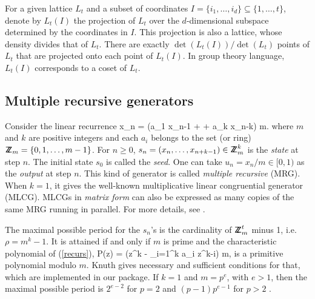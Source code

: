For a given lattice $L_t$ and a subset of coordinates
$I = \{i_1,\dots,i_d\} \subseteq \{1,\dots,t\}$, denote by $L_t(I)$
the projection of $L_t$ over the $d$-dimensional subspace determined
by the coordinates in $I$.
This projection is also a lattice, whose density divides that of $L_t$.
There are exactly $\det(L_t(I))/\det(L_t)$ points of $L_t$ that are
projected onto each point of $L_t(I)$.
In group theory language, $L_t(I)$ corresponds to a coset of $L_t$.

\subsection {Multiple recursive generators}

Consider the linear recurrence
\eq
   x_n = (a_1 x_{n-1} + \cdots + a_k x_{n-k}) \mod m.       
\endeq
where $m$ and $k$ are positive integers and each $a_i$ belongs to the
set (or ring) ${\sf Z\kern-0.4em Z}_m = \{0,1,\dots,m-1\}$.
For $n\ge 0$, $s_n = (x_{n},\dots,x_{n+k-1}) \in {\sf Z\kern-0.4em Z}_m^k$ is the {\em state}
at step $n$.  The initial state $s_0$ is called the {\em seed}.
One can take $u_n = x_n/m \in [0,1)$ as the {\em output} at step $n$.
This kind of generator is called {\em multiple recursive} (MRG).
When $k=1$, it gives the well-known multiplicative linear congruential
generator (MLCG).
MLCGs in {\em matrix form\/} can also be expressed as
many copies of the same MRG running in parallel.
For more details, see \cite{rGRO88a,rLEC90a,rLEC94a,rNIE86a}.

The maximal possible period for the $s_n$'s is the
cardinality of ${\sf Z\kern-0.4em Z}_m^t$ minus 1, i.e. $\rho = m^k-1$.
It is attained if and only if $m$ is prime and
the characteristic polynomial of (\ref{recurs}),
\eq
  P(z) = \left(z^k - \sum_{i=1}^k a_i z^{k-i}\right) \mod m,  
\endeq
is a primitive polynomial modulo $m$.
Knuth \cite {rKNU97a} gives necessary and sufficient
conditions for that, which are implemented in our package.
If $k=1$ and $m=p^e$, with $e > 1$, then
the maximal possible period is $2^{e-2}$ for $p=2$
and $(p-1)p^{e-1}$ for $p > 2$ \cite{rKNU97a,rLEC90a}.

